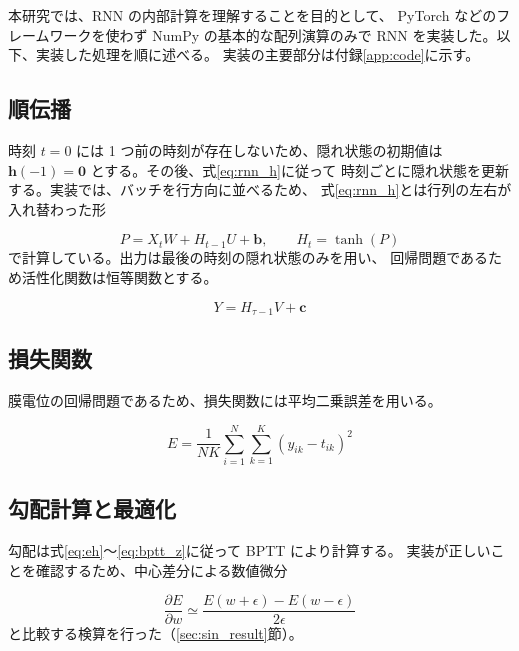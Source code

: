 \documentclass[a4paper,11pt,openany]{ltjsreport}
\begin{document}
本研究では、RNN の内部計算を理解することを目的として、
PyTorch などのフレームワークを使わず NumPy の基本的な配列演算のみで
RNN を実装した。以下、実装した処理を順に述べる。
実装の主要部分は付録\ref{app:code}に示す。

\subsection{順伝播}

時刻 $t = 0$ には 1 つ前の時刻が存在しないため、隠れ状態の初期値は
$\bm{h}(-1) = \bm{0}$ とする。その後、式\eqref{eq:rnn_h}に従って
時刻ごとに隠れ状態を更新する。実装では、バッチを行方向に並べるため、
式\eqref{eq:rnn_h}とは行列の左右が入れ替わった形

\begin{equation}
  P = X_t W + H_{t-1} U + \bm{b}, \qquad H_t = \tanh(P)
  \label{eq:forward_impl}
\end{equation}
で計算している。出力は最後の時刻の隠れ状態のみを用い、
回帰問題であるため活性化関数は恒等関数とする。

\begin{equation}
  Y = H_{\tau-1} V + \bm{c}
  \label{eq:out_impl}
\end{equation}

\subsection{損失関数}

膜電位の回帰問題であるため、損失関数には平均二乗誤差を用いる。

\begin{equation}
  E = \frac{1}{NK} \sum_{i=1}^{N} \sum_{k=1}^{K} \left( y_{ik} - t_{ik} \right)^2
  \label{eq:mse}
\end{equation}

\subsection{勾配計算と最適化}

勾配は式\eqref{eq:eh}〜\eqref{eq:bptt_z}に従って BPTT により計算する。
実装が正しいことを確認するため、中心差分による数値微分

\begin{equation}
  \frac{\partial E}{\partial w} \simeq \frac{E(w + \epsilon) - E(w - \epsilon)}{2\epsilon}
  \label{eq:numgrad}
\end{equation}
と比較する検算を行った（\ref{sec:sin_result}節）。
\end{document}
